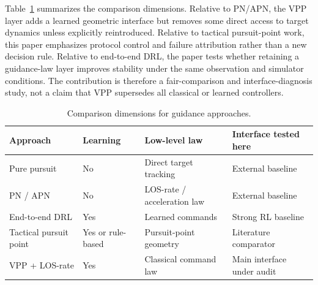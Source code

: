 Table~\ref{tab:related_work_comparison} summarizes the comparison dimensions. Relative to PN/APN, the VPP layer adds a learned geometric interface but removes some direct access to target dynamics unless explicitly reintroduced. Relative to tactical pursuit-point work, this paper emphasizes protocol control and failure attribution rather than a new decision rule. Relative to end-to-end DRL, the paper tests whether retaining a guidance-law layer improves stability under the same observation and simulator conditions. The contribution is therefore a fair-comparison and interface-diagnosis study, not a claim that VPP supersedes all classical or learned controllers.

\begin{table}[t]
\centering
\caption{Comparison dimensions for guidance approaches.}
\label{tab:related_work_comparison}
\small
\begin{tabular}{p{2.0cm}p{1.5cm}p{1.6cm}p{1.9cm}}
\toprule
Approach & Learning & Low-level law & Interface tested here \\
\midrule
Pure pursuit & No & Direct target tracking & External baseline \\
PN / APN & No & LOS-rate / acceleration law & External baseline \\
End-to-end DRL & Yes & Learned commands & Strong RL baseline \\
Tactical pursuit point & Yes or rule-based & Pursuit-point geometry & Literature comparator \\
VPP + LOS-rate & Yes & Classical command law & Main interface under audit \\
\bottomrule
\end{tabular}
\end{table}

